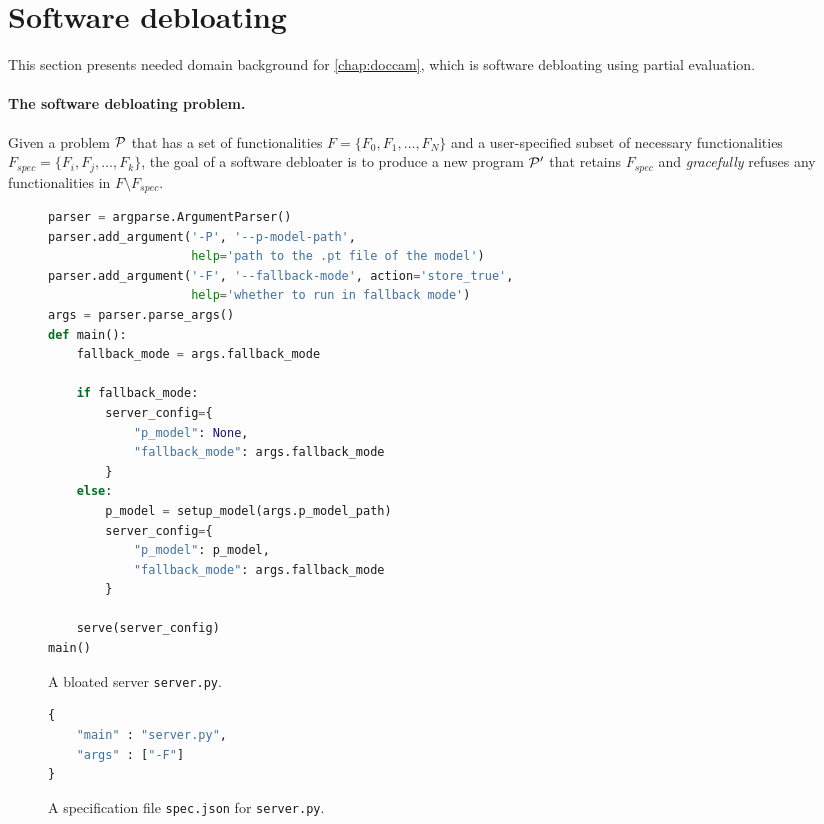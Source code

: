 \section{Software debloating}
This section presents needed domain background for \cref{chap:doccam}, which is software debloating using partial evaluation.
\paragraph{The software debloating problem.} Given a problem $\mathcal{P}$ that has a set of functionalities $F = \{F_0, F_1, \dots, F_N\}$ and a user-specified subset of necessary functionalities $F_{spec} = \{F_i, F_j, \dots, F_k\}$, the goal of a software debloater is to produce a new program $\mathcal{P}'$ that retains $F_{spec}$ and \emph{gracefully} refuses any functionalities in $F \setminus F_{spec}$.
\begin{figure}[t]
\begin{lstlisting}[language=Python]
parser = argparse.ArgumentParser()
parser.add_argument('-P', '--p-model-path', 
                    help='path to the .pt file of the model')
parser.add_argument('-F', '--fallback-mode', action='store_true', 
                    help='whether to run in fallback mode')
args = parser.parse_args()
def main():
    fallback_mode = args.fallback_mode
    
    if fallback_mode:
        server_config={
            "p_model": None,
            "fallback_mode": args.fallback_mode
        }
    else:
        p_model = setup_model(args.p_model_path)
        server_config={
            "p_model": p_model,
            "fallback_mode": args.fallback_mode
        }
        
    serve(server_config)
main()
\end{lstlisting}
    \caption{A bloated server \texttt{server.py}.}
    \label{fig:bloated_exp}
\end{figure}

\begin{figure}
    \begin{lstlisting}[language=Python]
{
    "main" : "server.py",
    "args" : ["-F"]
}
    \end{lstlisting}
    \caption{A specification file \texttt{spec.json} for \texttt{server.py}.}
    \label{fig:server_spec}
\end{figure}

